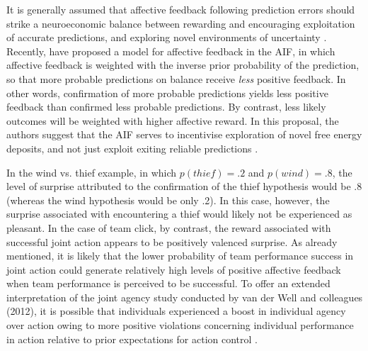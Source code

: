 \begin{CJK}{UTF8}{gbsn}
It is generally assumed that affective feedback following prediction errors should strike a neuroeconomic balance between rewarding and encouraging exploitation of accurate predictions, and exploring novel environments of uncertainty \citep{Chetverikov2014}.  Recently, \textcite{Chetverikov2016} have proposed a model for affective feedback in the AIF, in which affective feedback is weighted with the inverse prior probability of the prediction, so that more probable predictions on balance receive \textit{less} positive feedback.  In other words, confirmation of more probable predictions yields less positive feedback than confirmed less probable predictions.  By contrast, less likely outcomes will be weighted with higher affective reward.  In this proposal, the authors suggest that the AIF serves to incentivise exploration of novel free energy deposits, and not just exploit exiting reliable predictions \citep[thus proposing a dynamical solution to the ``dark room dilemma'' associated with traditional (non-dynamical) models theories of prediction error management;][]{Friston2012}.

In the wind vs. thief example, in which $p(thief)=.2$ and $p(wind)=.8$, the level of surprise attributed to the confirmation of the thief hypothesis would be .8 (whereas the wind hypothesis would be only .2). In this case, however, the surprise associated with encountering a thief would likely not be experienced as pleasant. In the case of team click, by contrast, the reward associated with successful joint action appears to be positively valenced surprise. As already mentioned, it is likely that the lower probability of team performance success in joint action could generate relatively high levels of positive affective feedback when team performance is perceived to be successful. To offer an extended interpretation of the joint agency study conducted by van der Well and colleagues (2012), it is possible that individuals experienced a boost in individual agency over action owing to more positive violations concerning individual performance in action relative to prior expectations for action control \citep[developed in the previous task in the experiment, in which their control over action was shared with another participant;][]{VanderWel2012}.













\end{CJK}
